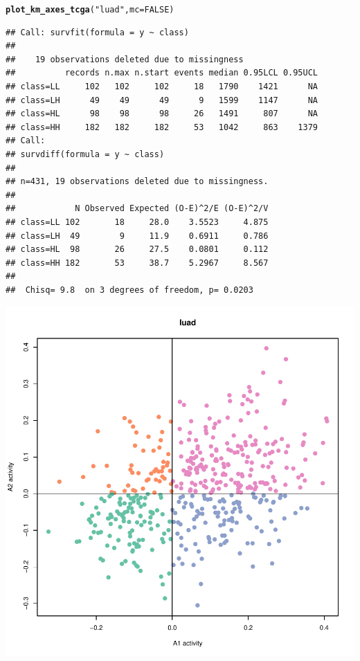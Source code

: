 \documentclass{article}\usepackage[]{graphicx}\usepackage[]{color}
\makeatletter
\def\maxwidth{ %
  \ifdim\Gin@nat@width>\linewidth
    \linewidth
  \else
    \Gin@nat@width
  \fi
}
\newcommand{\hlnum}[1]{\textcolor[rgb]{0.686,0.059,0.569}{#1}}%
\newcommand{\hlstr}[1]{\textcolor[rgb]{0.192,0.494,0.8}{#1}}%
\newcommand{\hlstd}[1]{\textcolor[rgb]{0.345,0.345,0.345}{#1}}%
\newcommand{\hlkwc}[1]{\textcolor[rgb]{0.333,0.667,0.333}{#1}}%
\newcommand{\hlkwd}[1]{\textcolor[rgb]{0.737,0.353,0.396}{\textbf{#1}}}%
\newenvironment{kframe}{%
 \def\at@end@of@kframe{}%
 \ifinner\ifhmode%
  \def\at@end@of@kframe{\end{minipage}}%
  \begin{minipage}{\columnwidth}%
 \fi\fi%
 \def\FrameCommand##1{\hskip\@totalleftmargin \hskip-\fboxsep
 \colorbox{shadecolor}{##1}\hskip-\fboxsep
     \hskip-\linewidth \hskip-\@totalleftmargin \hskip\columnwidth}%
 \MakeFramed {\advance\hsize-\width
   \@totalleftmargin\z@ \linewidth\hsize
   \@setminipage}}%
 {\par\unskip\endMakeFramed%
 \at@end@of@kframe}
\newenvironment{knitrout}{}{} %
\makeatother
\begin{document}
\begin{knitrout}
{}


\begin{kframe}\begin{alltt}
\hlkwd{plot_km_axes_tcga}\hlstd{(}\hlstr{"luad"}\hlstd{,} \hlkwc{mc} \hlstd{=} \hlnum{FALSE}\hlstd{)}
\end{alltt}


{\ttfamily\noindent{}}\begin{verbatim}
## Call: survfit(formula = y ~ class)
## 
##    19 observations deleted due to missingness 
##          records n.max n.start events median 0.95LCL 0.95UCL
## class=LL     102   102     102     18   1790    1421      NA
## class=LH      49    49      49      9   1599    1147      NA
## class=HL      98    98      98     26   1491     807      NA
## class=HH     182   182     182     53   1042     863    1379
## Call:
## survdiff(formula = y ~ class)
## 
## n=431, 19 observations deleted due to missingness.
## 
##            N Observed Expected (O-E)^2/E (O-E)^2/V
## class=LL 102       18     28.0    3.5523     4.875
## class=LH  49        9     11.9    0.6911     0.786
## class=HL  98       26     27.5    0.0801     0.112
## class=HH 182       53     38.7    5.2967     8.567
## 
##  Chisq= 9.8  on 3 degrees of freedom, p= 0.0203
\end{verbatim}
\end{kframe}

{\centering \includegraphics[width=\maxwidth]{figure/km-curves-13} 

}
\end{knitrout}
\end{document}
